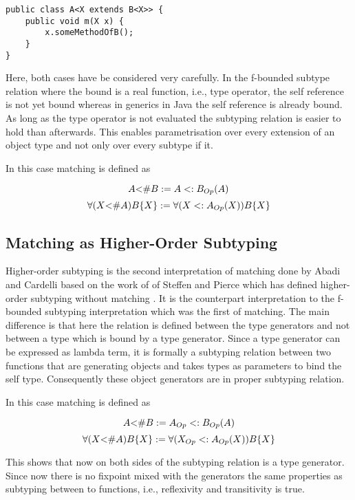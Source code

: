 \begin{lstlisting}[float=ht,caption={Universal quantified f-bound in Java},label={lst:generics}]
public class A<X extends B<X>> {
	public void m(X x) {
		x.someMethodOfB();
	}
}
\end{lstlisting}

Here, both cases have be considered very carefully. In the f-bounded subtype
relation where the bound is a real function, i.e., type operator,
the self reference is not yet bound whereas in generics in Java the self
reference is already bound. As long as the type operator is not evaluated
the subtyping relation is easier to hold than afterwards. This enables
parametrisation over every extension of an object type and not only over
every subtype if it.

In this case matching is defined as\cite{abadi_subtyping_1996}
\begin{defn}
	\label{def:matchingAsBound}
	\[A \textnormal{<\#} B := A <: B_{Op}(A)\]
	\[\forall (X \textnormal{<\#} A)B\{X\} := \forall (X <: A_{Op}(X))B\{X\}\]
\end{defn}

\subsection{Matching as Higher-Order Subtyping}
Higher-order subtyping is the second interpretation of matching done
by Abadi and Cardelli \cite{abadi_subtyping_1996} based on the work of
of Steffen and Pierce which has defined higher-order subtyping without
matching \cite{steffen_higher-order_1994}. It is the counterpart
interpretation to the f-bounded subtyping interpretation which was
the first of matching. The main difference is that here the relation is
defined between the type generators and not between a type which is bound
by a type generator. Since a type generator can be expressed as lambda
term, it is formally a subtyping relation between two functions that are
generating objects and takes types as parameters to bind the self type.
Consequently these object generators are in proper subtyping relation.

In this case matching is defined as\cite{abadi_subtyping_1996}
\begin{defn}
	\label{def:matchingAsHigherOrder}
	\[A \textnormal{<\#} B := A_{Op} <: B_{Op}(A)\]
	\[\forall (X \textnormal{<\#} A)B\{X\} := \forall (X_{Op} <: A_{Op}(X))B\{X\}\]
\end{defn}

This shows that now on both sides of the subtyping relation is a type
generator. Since now there is no fixpoint mixed with the generators
the same properties as subtyping between to functions, i.e., reflexivity
and transitivity is true.
